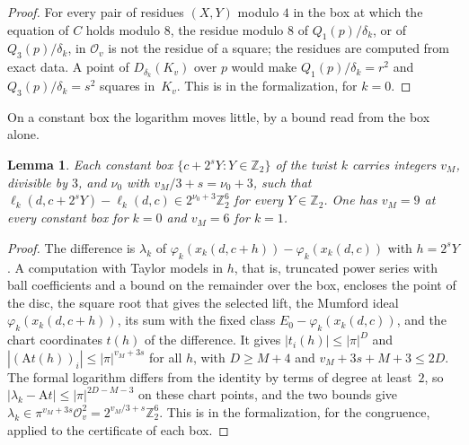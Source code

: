 \documentclass[11pt]{amsart}
\newtheorem{lemma}[theorem]{Lemma}
\theoremstyle{definition}
\numberwithin{equation}{section}
\newcommand{\Zt}{\mathbb{Z}_2}
\newcommand{\Ov}{\mathcal{O}_v}
\newcommand{\kv}{K_v}
\newcommand{\lean}[1]{\ignorespaces}
\begin{document}
\begin{proof}
For every pair of residues $(X,Y)$ modulo $4$ in the box at which the equation of $C$ holds modulo $8$, the residue modulo $8$ of $Q_1(p)/\delta_k$, or of $Q_3(p)/\delta_k$, in $\Ov$ is not the residue of a square; the residues are computed from exact data. A point of $D_{\delta_k}(\kv)$ over $p$ would make $Q_1(p)/\delta_k=r^2$ and $Q_3(p)/\delta_k=s^2$ squares in~$\kv$. This is  in the formalization, for $k=0$.
\end{proof}

On a constant box the logarithm moves little, by a bound read from the box alone.

\begin{lemma}\label{lem:constant-box}\lean{FurioLombardo.Discharge.M4Box.hConstLip_of_cert, FurioLombardo.Discharge.M4Box.BoxData.constCert_0, FurioLombardo.Discharge.M4Box.BoxData.constCert_1, FurioLombardo.Discharge.M4Log.IntModelKv.admM0, FurioLombardo.Discharge.M4Log.lamInt_of, FurioLombardo.Discharge.M4Box.DCertData.lamK_Dpt_le_one, FurioLombardo.Discharge.M4Box.m4RestKvW_0, FurioLombardo.Discharge.M4Box.m4RestKvW_1}
Each constant box $\{c+2^sY:Y\in\Zt\}$ of the twist $k$ carries integers $v_M$, divisible by $3$, and $\nu_0$ with $v_M/3+s=\nu_0+3$, such that $\ell_k(d,c+2^sY)-\ell_k(d,c)\in2^{\nu_0+3}\Zt^6$ for every $Y\in\Zt$. One has $v_M=9$ at every constant box for $k=0$ and $v_M=6$ for $k=1$.
\end{lemma}

\begin{proof}
The difference is $\lambda_k$ of $\varphi_k(x_k(d,c+h))-\varphi_k(x_k(d,c))$ with $h=2^sY$. A computation with Taylor models in $h$, that is, truncated power series with ball coefficients and a bound on the remainder over the box, encloses the point of the disc, the square root that gives the selected lift, the Mumford ideal $\varphi_k(x_k(d,c+h))$, its sum with the fixed class $E_0-\varphi_k(x_k(d,c))$, and the chart coordinates $t(h)$ of the difference. It gives $|t_i(h)|\le|\pi|^D$ and $|(\mathrm At(h))_i|\le|\pi|^{v_M+3s}$ for all $h$, with $D\ge M+4$ and $v_M+3s+M+3\le2D$. The formal logarithm differs from the identity by terms of degree at least~$2$, so $|\lambda_k-\mathrm At|\le|\pi|^{2D-M-3}$ on these chart points, and the two bounds give $\lambda_k\in\pi^{v_M+3s}\Ov^2=2^{v_M/3+s}\Zt^6$. This is  in the formalization, for the congruence, applied to the certificate of each box.
\end{proof}
\end{document}
